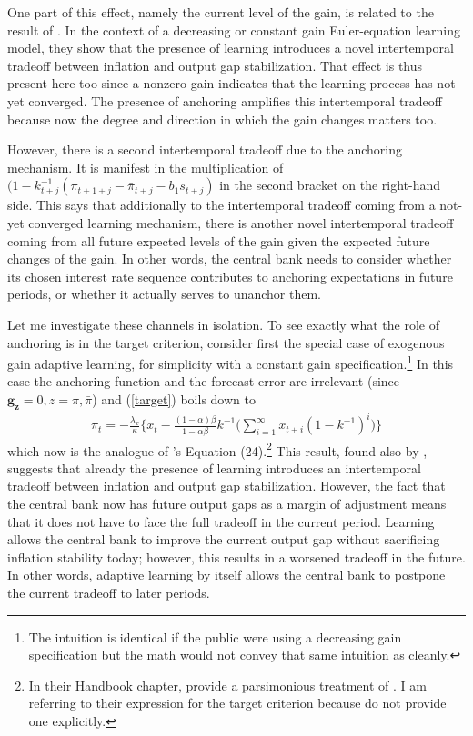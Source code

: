 \documentclass[11pt]{article}
\renewcommand{\[}{\begin{equation}}
\renewcommand{\]}{\end{equation}}
\begin{document}
One part of this effect, namely the current level of the gain, is related to the result of \cite{molnar2014optimal}. In the context of a decreasing or constant gain Euler-equation learning model, they show that the presence of learning introduces a novel intertemporal tradeoff between inflation and output gap stabilization. That effect is thus present here too since a nonzero gain indicates that the learning process has not yet converged. The presence of anchoring amplifies this intertemporal tradeoff because now the degree and direction in which the gain changes matters too. 

However, there is a second intertemporal tradeoff due to the anchoring mechanism. It is manifest in the multiplication of $(1-k_{t+j}^{-1}(\pi_{t+1+j} - \bar{\pi}_{t+j}-b_1 s_{t+j})$ in the second bracket on the right-hand side. This says that additionally to the intertemporal tradeoff coming from a not-yet converged learning mechanism, there is another novel intertemporal tradeoff coming from all future expected levels of the gain given the expected future changes of the gain. In other words, the central bank needs to consider whether its chosen interest rate sequence contributes to anchoring expectations in future periods, or whether it actually serves to unanchor them.

Let me investigate these channels in isolation. To see exactly what the role of anchoring is in the target criterion, consider first the special case of exogenous gain adaptive learning, for simplicity with a constant gain specification.\footnote{The intuition is identical if the public were using a decreasing gain specification but the math would not convey that same intuition as cleanly.} In this case the anchoring function and the forecast error are irrelevant (since $\mathbf{g_z}=0, z=\pi,\bar{\pi}$) and (\ref{target}) boils down to
\begin{align}
\pi_t  = -\frac{\lambda_x}{\kappa}\bigg\{x_t - \frac{(1-\alpha)\beta}{1-\alpha\beta} k^{-1}
\bigg(\sum_{i=1}^{\infty}x_{t+i}(1-k^{-1})^i \bigg)
\bigg\} \label{target_molnar} %
\end{align}
which now is the analogue of \cite{gaspar2010inflation}'s Equation (24).\footnote{In their Handbook chapter, \cite{gaspar2010inflation} provide a parsimonious treatment of \cite{molnar2014optimal}. I am referring to their expression for the target criterion because \cite{molnar2014optimal} do not provide one explicitly.} This result, found also by \cite{molnar2014optimal}, suggests that already the presence of learning introduces an intertemporal tradeoff between inflation and output gap stabilization. However, the fact that the central bank now has future output gaps as a margin of adjustment means that it does not have to face the full tradeoff in the current period. Learning allows the central bank to improve the current output gap without sacrificing inflation stability today; however, this results in a worsened tradeoff in the future. In other words, adaptive learning by itself allows the central bank to postpone the current tradeoff to later periods. 
\end{document}
